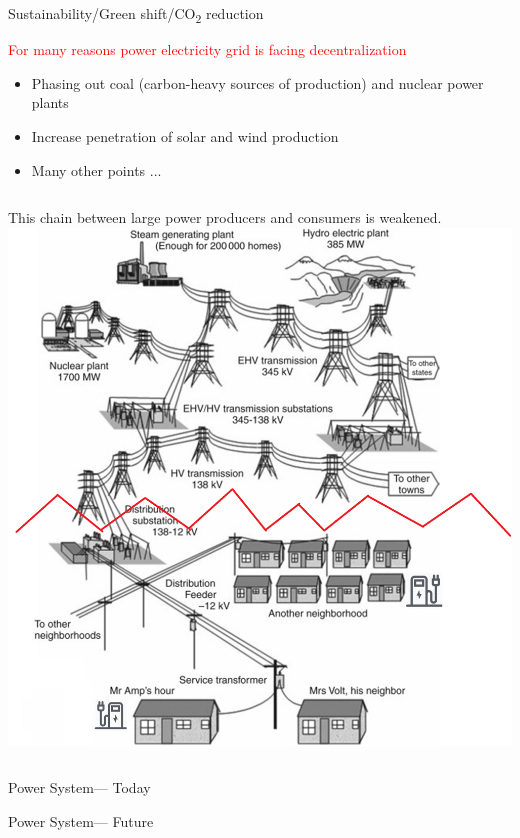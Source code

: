 \documentclass{beamer}
\begin{document}
\begin{frame}{Sustainability/Green shift/CO\textsubscript{2} reduction}
\begin{alertblock}{\textcolor{red}{For many reasons power electricity grid is facing decentralization}}
\begin{itemize}
\item Phasing out coal (carbon-heavy sources of production) and nuclear power plants
\item Increase penetration of solar and wind production
\item Many other points ...
\end{itemize}
\end{alertblock}
\begin{columns}
    This chain between large power producers and consumers is weakened.
\includegraphics[width=2 in , height=1.6 in]{Figures/EVchalendgebreak.png}
\end{columns}
\end{frame}


\begin{frame}{Power System--- Today}
\centering
{}
\end{frame}
\begin{frame}{Power System--- Future}
\centering
{}
\end{frame}
\end{document}
